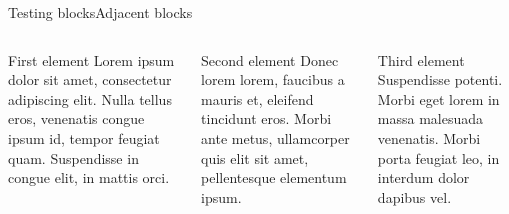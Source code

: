 \documentclass[aspectratio=169]{beamer}
\begin{document}


\begin{frame}{Testing blocks}{Adjacent blocks}
  \begin{columns}[t]
    \begin{column}{0.4\textwidth}
      \begin{block}{First element}
        Lorem ipsum dolor sit amet, consectetur adipiscing elit. Nulla tellus eros, venenatis congue ipsum id, tempor feugiat quam. Suspendisse in congue elit, in mattis orci.
      \end{block}
    \end{column}

    \begin{column}{0.3\textwidth}
      \begin{block}{Second element}
        Donec lorem lorem, faucibus a mauris et, eleifend tincidunt eros. Morbi ante metus, ullamcorper quis elit sit amet, pellentesque elementum ipsum.
      \end{block}
    \end{column}

    \begin{column}{0.3\textwidth}
      \begin{block}{Third element}
        Suspendisse potenti. Morbi eget lorem in massa malesuada venenatis. Morbi porta feugiat leo, in interdum dolor dapibus vel.
      \end{block}
    \end{column}
  \end{columns}
\end{frame}




\end{document}
